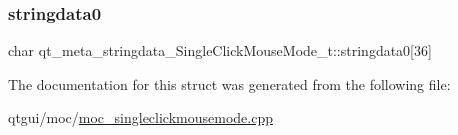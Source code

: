 \subsubsection{\texorpdfstring{stringdata0}{stringdata0}}
{\footnotesize\ttfamily char qt\+\_\+meta\+\_\+stringdata\+\_\+\+Single\+Click\+Mouse\+Mode\+\_\+t\+::stringdata0\mbox{[}36\mbox{]}}



The documentation for this struct was generated from the following file\+:\begin{DoxyCompactItemize}
\item 
qtgui/moc/\mbox{\hyperlink{moc__singleclickmousemode_8cpp}{moc\+\_\+singleclickmousemode.\+cpp}}\end{DoxyCompactItemize}
